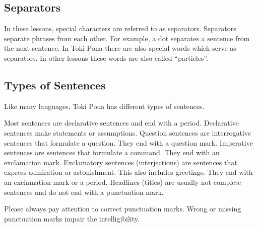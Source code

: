 \subsection*{Separators}
In these lessons, special characters are referred to as separators.
Separators separate phrases from each other.
For example, a dot separates a sentence from the next sentence.
In Toki Pona there are also special words which serve as separators.
In other lessons these words are also called ``particles''.

\subsection*{Types of Sentences}

Like many languages, Toki Pona has different types of sentences.

Most sentences are declarative sentences and end with a period.
Declarative sentences make statements or assumptions.
%
Question sentences are interrogative sentences that formulate a question.
They end with a question mark.
%
Imperative sentences are sentences that formulate a command.
They end with an exclamation mark.
%
Exclamatory sentences (interjections) are sentences that express admiration or astonishment.
This also includes greetings.
They end with an exclamation mark or a period.
%
Headlines (titles) are usually not complete sentences and do not end with a punctuation mark.

Please always pay attention to correct punctuation marks.
Wrong or missing punctuation marks impair the intelligibility.

